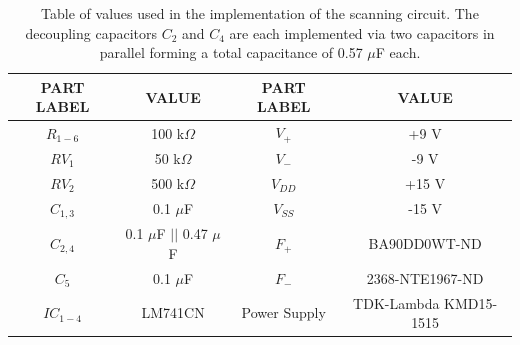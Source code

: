 \documentclass{article}
\begin{document}
\begin{table}
	\centering
	\begin{tabular}{|c|c||c|c|}
	\hline
	PART LABEL & VALUE & PART LABEL & VALUE\\
	\hline \hline $R_{1-6}$ & 100 k$\Omega$ & $V_+$ & +9 V \\
	\hline $RV_1$ & 50 k$\Omega$ & $V_-$ & -9 V\\
	\hline $RV_2$ & 500 k$\Omega$ & $V_{DD}$ & +15 V\\
	\hline $C_{1,3}$ & 0.1 $\mu$F & $V_{SS}$ & -15 V\\
	\hline $C_{2,4}$ & 0.1 $\mu$F $||$ 0.47 $\mu$F & $F_+$ & BA90DD0WT-ND\\
	\hline $C_5$ & 0.1 $\mu$F & $F_-$ & 2368-NTE1967-ND\\ 
	\hline $IC_{1-4}$ &  LM741CN & Power Supply & TDK-Lambda KMD15-1515 \\ 
	\hline
	\end{tabular}
	\caption{Table of values used in the implementation of the scanning circuit. The decoupling capacitors $C_{2}$ and $C_4$ are each implemented via two capacitors in parallel forming a total capacitance of 0.57 $\mu$F each.}
	\label{materials}
\end{table}
\end{document}
